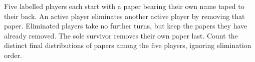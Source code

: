 Five labelled players each start with a paper bearing their own name taped to their back. An active player eliminates another active player by removing that paper. Eliminated players take no further turns, but keep the papers they have already removed. The sole survivor removes their own paper last. Count the distinct final distributions of papers among the five players, ignoring elimination order.
